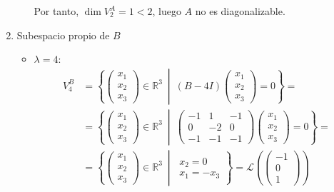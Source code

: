 \documentclass[12pt]{article}
\begin{document}
\begin{ejercicio}[2 puntos]
\begin{enumerate}
\begin{itemize}
			Por tanto, \(\dim V_2^A = 1<2\), luego \( A \) no es diagonalizable.
		
		\end{itemize}

		\item Subespacio propio de \( B \)
		\begin{itemize}
			\item \( \lambda = 4 \):
			\begin{align*}
				V_4^B &= \left\{
				\begin{pmatrix}
					x_1 \\
					x_2 \\
					x_3
				\end{pmatrix}
				\in \mathbb{R}^3 \ \middle| \
				(B - 4I)
				\begin{pmatrix}
					x_1 \\
					x_2 \\
					x_3
				\end{pmatrix}
				= 0
				\right\}
				=\\&= \left\{
				\begin{pmatrix}
					x_1 \\
					x_2 \\
					x_3
				\end{pmatrix}
				\in \mathbb{R}^3 \ \middle| \
				\begin{pmatrix}
					-1 & 1 & -1 \\
					0 & -2 & 0 \\
					-1 & -1 & -1
				\end{pmatrix}
				\begin{pmatrix}
					x_1 \\
					x_2 \\
					x_3
				\end{pmatrix}
				= 0
				\right\}
				=\\&= \left\{
				\begin{pmatrix}
					x_1 \\
					x_2 \\
					x_3
				\end{pmatrix}
				\in \mathbb{R}^3 \ \middle| \
				\begin{array}{l}
					x_2 = 0 \\
					x_1 = -x_3
				\end{array}
				\right\}
				= \mathcal{L} \left( \begin{pmatrix} -1 \\ 0 \\ 1 \end{pmatrix} \right)
			\end{align*}


\end{itemize}
\end{enumerate}
\end{ejercicio}
\end{document}

